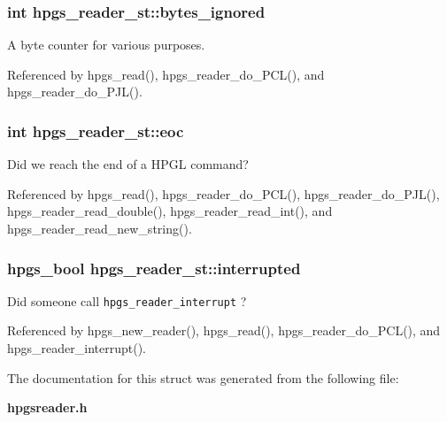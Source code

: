 \subsubsection[bytes\_\-ignored]{\setlength{\rightskip}{0pt plus 5cm}int {\bf hpgs\_\-reader\_\-st::bytes\_\-ignored}}\label{structhpgs__reader__st_224d05ab1b2d4f53c5c623221c439031}


A byte counter for various purposes. 

Referenced by hpgs\_\-read(), hpgs\_\-reader\_\-do\_\-PCL(), and hpgs\_\-reader\_\-do\_\-PJL().
\subsubsection[eoc]{\setlength{\rightskip}{0pt plus 5cm}int {\bf hpgs\_\-reader\_\-st::eoc}}\label{structhpgs__reader__st_f6ab3ba49fa4700f2f4abd6cf4c251f6}


Did we reach the end of a HPGL command? 

Referenced by hpgs\_\-read(), hpgs\_\-reader\_\-do\_\-PCL(), hpgs\_\-reader\_\-do\_\-PJL(), hpgs\_\-reader\_\-read\_\-double(), hpgs\_\-reader\_\-read\_\-int(), and hpgs\_\-reader\_\-read\_\-new\_\-string().
\subsubsection[interrupted]{\setlength{\rightskip}{0pt plus 5cm}hpgs\_\-bool {\bf hpgs\_\-reader\_\-st::interrupted}}\label{structhpgs__reader__st_d3efd09b11ca226c560481cb1dc1e343}


Did someone call {\tt hpgs\_\-reader\_\-interrupt} ? 

Referenced by hpgs\_\-new\_\-reader(), hpgs\_\-read(), hpgs\_\-reader\_\-do\_\-PCL(), and hpgs\_\-reader\_\-interrupt().

The documentation for this struct was generated from the following file:\begin{CompactItemize}
\item 
{\bf hpgsreader.h}\end{CompactItemize}
